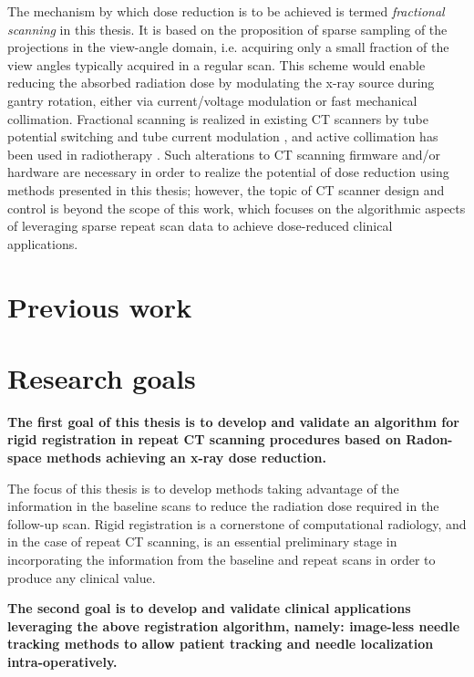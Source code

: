 The mechanism by which dose reduction is to be achieved is termed \textit{fractional scanning} in this thesis. 
It is based on the proposition of sparse sampling of the projections in the view-angle domain, i.e. acquiring only a small fraction of the view angles typically acquired in a regular scan.
This scheme would enable reducing the absorbed radiation dose by modulating the x-ray source during gantry rotation, either via current/voltage modulation or fast mechanical collimation.
Fractional scanning is realized in existing CT scanners by tube potential switching and tube current modulation \cite{kalra2004techniques}, and active collimation has been used in radiotherapy \cite{mackie2006history}.
Such alterations to CT scanning firmware and/or hardware are necessary in order to realize the potential of dose reduction using methods presented in this thesis; however, the topic of CT scanner design and control is beyond the scope of this work, which focuses on the algorithmic aspects of leveraging sparse repeat scan data to achieve dose-reduced clinical applications.

\section{Previous work}





\section{Research goals}

\textbf{The first goal of this thesis is to develop and validate an algorithm for rigid registration in repeat CT scanning procedures based on Radon-space methods achieving an x-ray dose reduction.}

The focus of this thesis is to develop methods taking advantage of the information in the baseline scans to reduce the radiation dose required in the follow-up scan. Rigid registration is a cornerstone of computational radiology, and in the case of repeat CT scanning, is an essential preliminary stage in incorporating the information from the baseline and repeat scans in order to produce any clinical value.

\textbf{The second goal is to develop and validate clinical applications leveraging the above registration algorithm, namely: image-less needle tracking methods to allow patient tracking and needle localization intra-operatively.}

